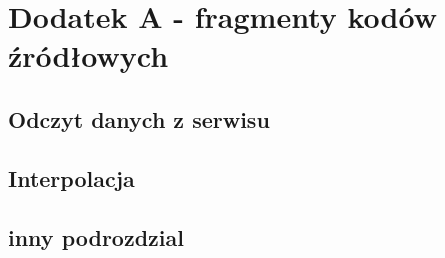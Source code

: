 \chapter{Dodatek A - fragmenty kodów źródłowych}
\label{cha:dodatek_A}
\section{Odczyt danych z serwisu}
\label{sec:kod_odczyt_danych}
\section{Interpolacja}
\section{inny podrozdzial}